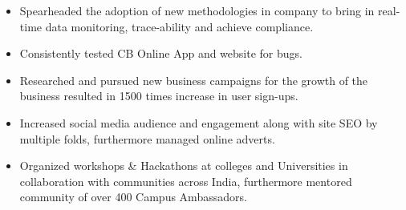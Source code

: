 \documentclass[10pt,a4paper,ragged2e]{altacv}
\begin{document}

\begin{fullwidth}
\makecvheader
\end{fullwidth}



\begin{itemize}
\item Spearheaded the adoption of new methodologies in company to bring in real-time data monitoring, trace-ability and achieve compliance. 
\item Consistently tested CB Online App and website for bugs.
\item Researched and pursued new business campaigns for the growth of the business resulted in 1500 times increase in user sign-ups.
\item Increased social media audience and engagement along with site SEO by multiple folds, furthermore managed online adverts.
\item Organized workshops \& Hackathons at colleges and Universities in collaboration with communities across India, furthermore mentored community of over 400 Campus Ambassadors.
\end{itemize}
\end{document}
